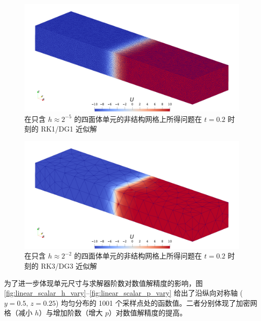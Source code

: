 \begin{figure}[h!]
\begin{centering}
\includegraphics[width=1\textwidth,height=0.4\textheight,keepaspectratio]{../mdpi/figures/linear_scalar/p=1_h=2^-5}
\par\end{centering}
\caption{\label{fig:linear_scalar_p=00003D1_h=00003D2^-5}在只含 $h\approx2^{-5}$
的四面体单元的非结构网格上所得问题在
$t=0.2$ 时刻的 RK1/DG1 近似解}
\end{figure}

\begin{figure}[h!]
\begin{centering}
\includegraphics[width=1\textwidth,height=0.4\textheight,keepaspectratio]{../mdpi/figures/linear_scalar/p=3_h=2^-2}
\par\end{centering}
\caption{\label{fig:linear_scalar_p=00003D3_h=00003D2^-2}在只含 $h\approx2^{-2}$
的四面体单元的非结构网格上所得问题在
$t=0.2$ 时刻的 RK3/DG3 近似解}
\end{figure}

为了进一步体现单元尺寸与求解器阶数对数值解精度的影响，图 \ref{fig:linear_scalar_h_vary}–\ref{fig:linear_scalar_p_vary}
给出了沿纵向对称轴 ($y=0.5,\,z=0.25$) 均匀分布的 1001 个采样点处的函数值。二者分别体现了加密网格（减小
$h$）与增加阶数（增大 $p$）对数值解精度的提高。

